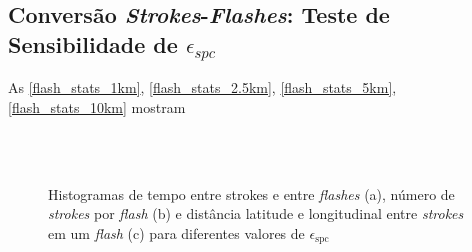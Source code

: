 \begin{anexosenv}

\partanexos

\chapter{Conversão \textit{Strokes}-\textit{Flashes}: Teste de Sensibilidade de $\epsilon_{spc}$}
\label{anexo_conversao}

As \autoref{flash_stats_1km}, \autoref{flash_stats_2.5km}, \autoref{flash_stats_5km}, \autoref{flash_stats_10km} mostram 


\begin{figure}[hp]
	\begin{center}
		\caption{Histogramas de tempo entre strokes e entre \textit{flashes} (a), número de \textit{strokes} por \textit{flash} (b) e distância latitude e longitudinal entre \textit{strokes} em um \textit{flash} (c) para diferentes valores de $\epsilon_{\text{spc}}$} 
		\label{flash_stats_mult1}
		 \\
		 \\
	\end{center}
\end{figure}


\end{anexosenv}

